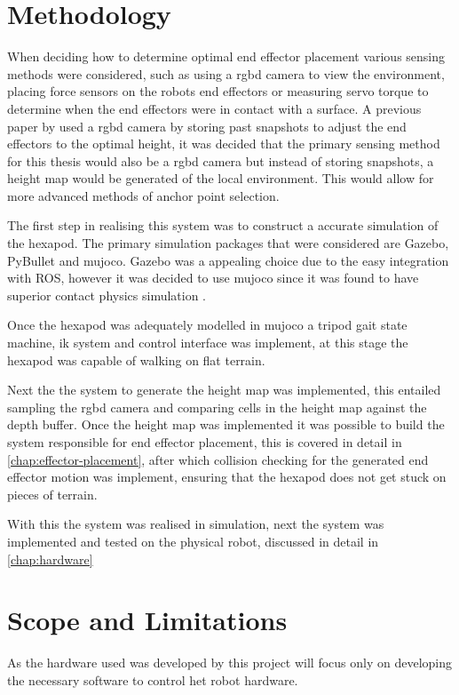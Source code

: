\section{Methodology}
When deciding how to determine optimal end effector placement various sensing methods were considered, such as using a \ac{rgbd} camera to view the environment,
placing force sensors on the robots end effectors or measuring servo torque to determine when the end effectors were in contact with a surface. A previous paper by \cite{erasmus2023guidance} used a \ac{rgbd} camera
by storing past snapshots to adjust the end effectors to the optimal height, it was decided that the primary sensing method for this thesis would also be a \ac{rgbd} camera
but instead of storing snapshots, a height map would be generated of the local environment. This would allow for more advanced methods of anchor point selection.

The first step in realising this system was to construct a accurate simulation of the hexapod. The primary simulation packages that were considered are Gazebo, PyBullet and \ac{mujoco}.
Gazebo was a appealing choice due to the easy integration with ROS, however it was decided to use \ac{mujoco} since it was found to have superior contact physics simulation \citep{Erez-2015}.

Once the hexapod was adequately modelled in \ac{mujoco} a tripod gait state machine, \ac{ik} system and control interface was implement, at this stage the hexapod was capable of walking
on flat terrain.

Next the the system to generate the height map was implemented, this entailed sampling the \ac{rgbd} camera and comparing cells in the height map against the depth buffer.
Once the height map was implemented it was possible to build the system responsible for end effector placement, this is covered in detail in \autoref{chap:effector-placement},
after which collision checking for the generated end effector motion was implement, ensuring that the hexapod does not get stuck on pieces of terrain.

With this the system was realised in simulation, next the system was implemented and tested on the physical robot, discussed in detail in \autoref{chap:hardware}

\section{Scope and Limitations}

As the hardware used was developed by \cite{erasmus2023guidance} this project will focus only on developing the necessary software to control het robot hardware.

